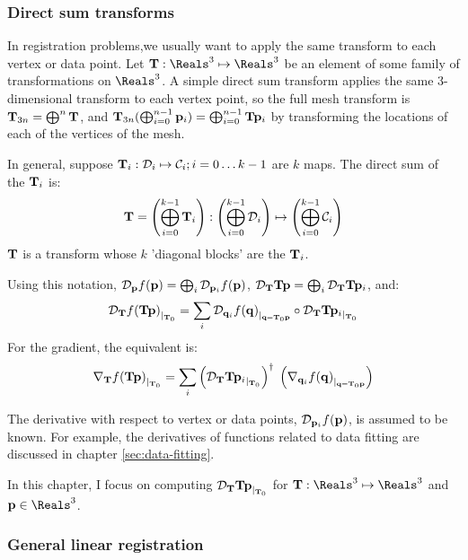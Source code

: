 \subsubsection{Direct sum transforms}
\label{sec:Direct-sum-transforms}

In registration problems,we usually want to
apply the same transform to each vertex or data point.
Let $\Tr : \Reals^3 \mapsto \Reals^3$ be an element
of some family of transformations on $\Reals^3$.
A simple direct sum transform applies the same 3-dimensional
transform to each vertex point,
so the full mesh transform is
${\mathbf T}_{3n} = \bigoplus^n {\mathbf T}$,
and ${\mathbf T}_{3n} (\bigoplus_{i=0}^{n-1} {\mathbf p}_i) = \bigoplus_{i=0}^{n-1} {\mathbf T} {\mathbf p}_i$
by transforming the locations of each of the vertices
of the mesh.

In general, suppose ${\mathbf T}_i :
{\mathcal D}_i \mapsto {\mathcal C}_i; i = 0 \ldots k-1$
are $k$ maps.
The direct sum of the ${\mathbf T}_i$ is:
\begin{equation}
\label{eq:diagonal-blocks}
{\mathbf T} =
\left( \bigoplus_{i=0}^{k-1} {\mathbf T}_i \right) :
\left( \bigoplus_{i=0}^{k-1}{\mathcal D}_i \right)
\mapsto
\left( \bigoplus_{i=0}^{k-1}{\mathcal C}_i \right)
\end{equation}
${\mathbf T}$ is a transform whose
$k$ 'diagonal blocks' are the ${\mathbf T}_i$.

Using this notation,
${\mathcal D}_{{\mathbf p}}{f({\mathbf p})} = \bigoplus_i {\mathcal D}_{{\mathbf p}_i}{f({\mathbf p})}$,
${\mathcal D}_{{\mathbf T}}{{\mathbf T}{\mathbf p}} = \bigoplus_i {\mathcal D}_{{\mathbf T}}{{\mathbf T}{\mathbf p}_i}$,
and:
\begin{equation}
\label{eq:total-registration-transform-derivative}
{\mathcal D}_{{\mathbf T}}{f( {\mathbf T} {\mathbf p} )}_{\mid_{{\mathbf T}_0}}
 =
\sum_i
{\mathcal D}_{{\mathbf q}_i}{f({\mathbf q})}_{\mid_{{\mathbf q}={\mathbf T}_0{\mathbf p}}}
\circ
{\mathcal D}_{{\mathbf T}}{{\mathbf T}{\mathbf p}_i}_{\mid_{{\mathbf T}_0}}
\end{equation}
For the gradient, the equivalent is:
\begin{equation}
\label{eq:registration-gradient-sum}
{\mathbf \nabla}_{{\mathbf T}}{{f( {\mathbf T} {\mathbf p} )}}_{\mid_{{\mathbf T}_0}}
 =
\sum_i
\left( {\mathcal D}_{{\mathbf T}}{{\mathbf T}{\mathbf p}_i}_{\mid_{{\mathbf T}_0}} \right)^{\dagger} \;
\left( {\mathbf \nabla}_{{\mathbf q}_i}{{f({\mathbf q})}}_{\mid_{{\mathbf q}={\mathbf T}_0{\mathbf p}}} \right)
\end{equation}

The derivative with respect to vertex or data points,
${\mathcal D}_{{\mathbf p}_i}{f({\mathbf p})}$,
is assumed to be known.
For example, the derivatives of functions
related to data fitting
are discussed in chapter \ref{sec:data-fitting}.

In this chapter, I focus on computing
${\mathcal D}_{{\mathbf T}}{{\mathbf T}{\mathbf p}}_{\mid_{{\mathbf T}_0}}$
for $\Tr : \Reals^3 \mapsto \Reals^3$
and $\p \in \Reals^3$.

\subsubsection{General linear registration}
\label{sec:General-linear-registration}

